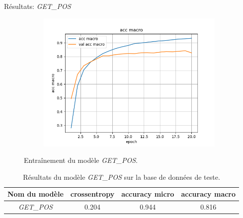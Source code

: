 \documentclass[11pt]{beamer}
\begin{document}
\begin{frame}{Résultats: \textit{GET\_POS} }
\begin{figure}
\begin{subfigure}{0.32\textwidth}
            \centering
            \includegraphics[width=\linewidth]{../logs/get_pos_French/acc macro.png}
        \end{subfigure}
        \caption{Entraînement du modèle \textit{GET\_POS}.}
    \end{figure}

    \begin{table}
        \centering
        \begin{tabular}{|c|c|c|c|}
            \hline
            Nom du modèle & crossentropy & accuracy micro & accuracy macro \\
            \hline
            \textit{GET\_POS} & 0.204 & 0.944 & 0.816\\
            \hline
        \end{tabular}
        \caption{Résultats du modèle \textit{GET\_POS} sur la base de données de teste.}
        \label{tab:test getpos}
    \end{table}
\end{frame}
\end{document}
